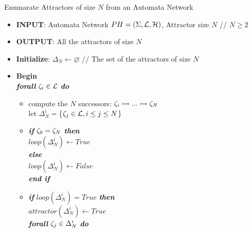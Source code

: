 \begin{algorithm}[!h]
	\caption{Enumarate Attractors of size $N$ from an Automata Network}
	\label{alg:PH-attractor}
	\begin{itemize}
		\item[] \textbf{INPUT}: Automata Network $PH=(\Sigma,\mathcal{L},\mathcal{H})$, Attractor size $N$ // $N \geq 2$
		\item[] \textbf{OUTPUT}: All the attractors of size $N$
		\item[] \textbf{Initialize}: $\Delta_N \longleftarrow \varnothing$ // The set of the attractors of size $N$
		\item[] \textbf{Begin} \\
		
			\hspace{0.2cm}	\textbf{\textit{forall}} $\zeta_i \in \mathcal{L}$ \textbf{\textit{do}} 
				
				\begin{itemize}
					\item[] compute the $N$ successors: $\zeta_i \rightarrowtail ... \rightarrowtail \zeta_N$ \\ let $\Delta_N^i=$\{$\zeta_j \in \mathcal{L}, i \leq j \leq N$\} %
					
					\item[] \textbf{\textit{if}} $\zeta_0 = \zeta_N$ \textbf{\textit{then}} \\
						\hspace{0.7cm}  $loop(\Delta_N^i) \longleftarrow True$ \\
					 \textbf{\textit{else}} \\
					 	\hspace{0.7cm}  $loop(\Delta_N^i) \longleftarrow False$ \\
					 \textbf{\textit{end if}} 
					 
					\item[] \textbf{\textit{if}} $loop(\Delta_N^i) = True$ \textbf{\textit{then}} \\
					
							\hspace{0.7cm} $attractor(\Delta_N^i) \longleftarrow True$	\\
							
							\hspace{0.7cm} \textbf{\textit{forall}} $\zeta_j \in \Delta_N^i$ \textbf{\textit{do}} \\
							

\end{itemize}
\end{itemize}
\end{algorithm}
